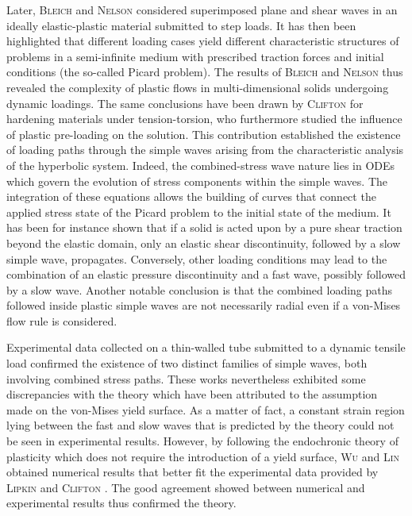 Later, \textsc{Bleich} and \textsc{Nelson} \cite{Bleich} considered superimposed plane and shear waves in an ideally elastic-plastic material submitted to step loads.
It has then been highlighted that different loading cases yield different characteristic structures of problems in a semi-infinite medium with prescribed traction forces and initial conditions (the so-called Picard problem).
The results of \textsc{Bleich} and \textsc{Nelson} thus revealed the complexity of plastic flows in multi-dimensional solids undergoing dynamic loadings.
The same conclusions have been drawn by \textsc{Clifton} \cite{Clifton} for hardening materials under tension-torsion, who furthermore studied the influence of plastic pre-loading on the solution.
This contribution established the existence of loading paths through the simple waves arising from the characteristic analysis of the hyperbolic system.
Indeed, the combined-stress wave nature lies in ODEs which govern the evolution of stress components within the simple waves.
The integration of these equations allows the building of curves that connect the applied stress state of the Picard problem to the initial state of the medium.
It has been for instance shown that if a solid is acted upon by a pure shear traction beyond the elastic domain, only an elastic shear discontinuity, followed by a slow simple wave, propagates.
Conversely, other loading conditions may lead to the combination of an elastic pressure discontinuity and a fast wave, possibly followed by a slow wave.
Another notable conclusion is that the combined loading paths followed inside plastic simple waves are not necessarily radial even if a von-Mises flow rule is considered.

Experimental data collected on a thin-walled tube submitted to a dynamic tensile load \cite{Clifton_exp,Clifton_exp2} confirmed the existence of two distinct families of  simple waves, both involving combined stress paths.
These works nevertheless exhibited some discrepancies with the theory which have been attributed to the assumption made on the von-Mises yield surface.
As a matter of fact, a constant strain region lying between the fast and slow waves that is predicted by the theory \cite{Clifton} could not be seen in experimental results.
However, by following the endochronic theory of plasticity \cite{Valanis} which does not require the introduction of a yield surface, \textsc{Wu} and \textsc{Lin} \cite{Wu_experimental} obtained numerical results that better fit the experimental data provided by \textsc{Lipkin} and \textsc{Clifton} \cite{Clifton_exp2}.
The good agreement showed between numerical and experimental results \cite{Wu_experimental} thus confirmed the theory.

